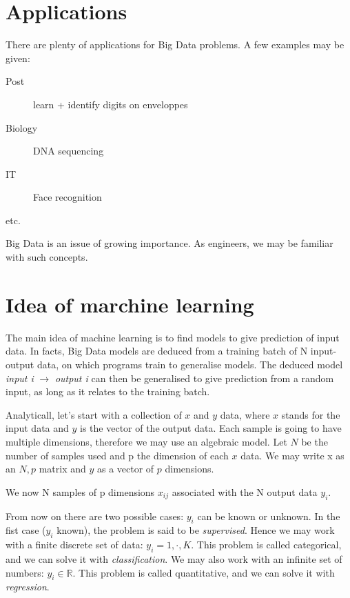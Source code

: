 \documentclass[a4paper]{tufte-book}
\begin{document}
\section*{Applications}

There are plenty of applications for Big Data problems. A few examples may be given:
\begin{description}
    \item[Post] learn + identify digits on enveloppes
    \item[Biology] DNA sequencing
    \item[IT] Face recognition
    \item[etc.]
\end{description}

Big Data is an issue of growing importance. As engineers, we may be familiar with such concepts.
\section*{Idea of marchine learning} 

The main idea of machine learning is to find models to give prediction of input data.
In facts, Big Data models are deduced from a training batch of N input-output
data, on which programs train to generalise models.
The deduced model \emph{input i} $\rightarrow$ \emph{output i} can then be
generalised to give prediction from a random input, as long as it relates to 
the training batch.



Analyticall, let's start with a collection of $x$ and $y$ data, where $x$ stands
for the input data and $y$ is the vector of the output data.
Each sample is going to have multiple dimensions, therefore we may use an
algebraic model. Let $N$ be the number of samples used and p the dimension of
each $x$ data. We may write x as an $N,p$ matrix and $y$ as a vector of $p$
dimensions.

We now N samples of p dimensions $x_{ij}$ associated with the N output data $y_i$.

From now on there are two possible cases: $y_i$ can be known or unknown.
In the fist case ($y_i$ known), the problem is said to be \emph{supervised}.
Hence we may work with a finite discrete set of data: $y_i = 1, \cdot, K$.
This problem is called categorical, and we can solve it with 
\emph{classification}.
We may also work with an infinite set of numbers: $y_i \in \mathbb{R}$. This
problem is called quantitative, and we can solve it with \emph{regression}.
\end{document}
